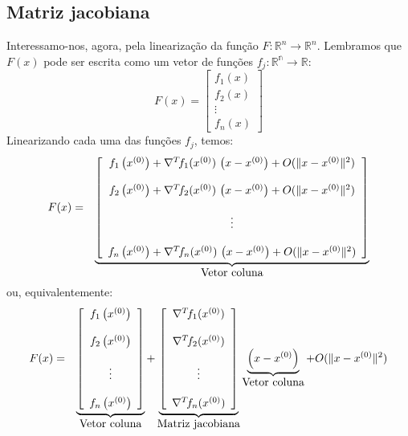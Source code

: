 \subsection{Matriz jacobiana}
Interessamo-nos, agora, pela linearização da função $F:\mathbb{R}^n\to \mathbb{R}^n$. Lembramos que $F(x)$ pode ser escrita como um vetor de funções $f_j:\mathbb{R^n}\to\mathbb{R}$:
\begin{equation*}
  F(x)=\left[\begin{matrix}
      f_1(x)\\
      f_2(x)\\
      \vdots\\
      f_n(x)
    \end{matrix}\right]
\end{equation*}
Linearizando cada uma das funções $f_j$, temos:
\begin{eqnarray*}
F(x)&=&\underbrace{\left[
\begin{array}{c}
f_1\left(x^{(0)}\right)+\nabla^T\! f_1(x^{(0)})\!~\left(x-x^{(0)}\right)   + O(\|x-x^{(0)}\|^2)\\~\\
f_2\left(x^{(0)}\right)+\nabla^T\! f_2(x^{(0)})\!~\left(x-x^{(0)}\right)   + O(\|x-x^{(0)}\|^2)\\~\\
\vdots\\~\\
f_n\left(x^{(0)}\right)+\nabla^T\! f_n(x^{(0)})\!~\left(x-x^{(0)}\right)   + O(\|x-x^{(0)}\|^2)
\end{array}
\right]}_{\hbox{Vetor coluna}}
\end{eqnarray*}
ou, equivalentemente:
\begin{eqnarray*}
 F(x) &=&\underbrace{\left[
\begin{array}{c}
f_1\left(x^{(0)}\right)\\~\\
f_2\left(x^{(0)}\right)\\~\\
\vdots\\~\\
f_n\left(x^{(0)}\right)
\end{array}
\right]}_{\hbox{Vetor coluna}}+
\underbrace{\left[
\begin{array}{c}\nabla^T\! f_1(x^{(0)})\\~~\\
\nabla^T\! f_2(x^{(0)})\\~~\\
\vdots\\~~\\
\nabla^T\! f_n(x^{(0)})
\end{array}
\right]}_{\hbox{Matriz jacobiana}}\underbrace{\left(x-x^{(0)}\right)}_{\hbox{Vetor coluna}}+O(\|x-x^{(0)}\|^2)
\end{eqnarray*}

